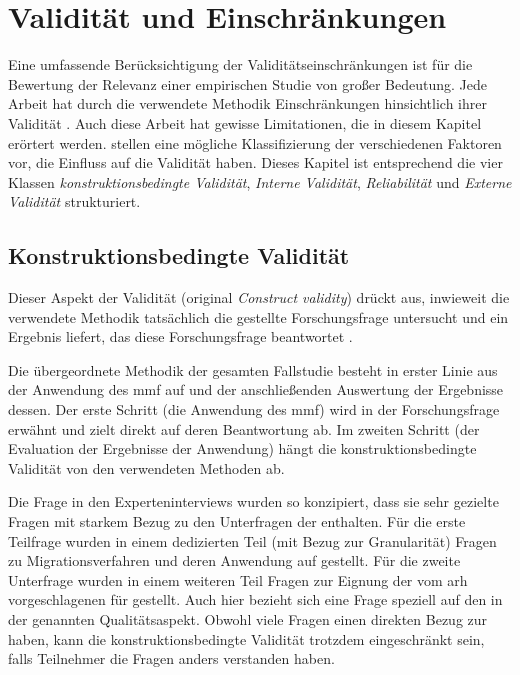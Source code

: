 \chapter{Validität und Einschränkungen}
\label{chap:gueltigkeit}

Eine umfassende Berücksichtigung der Validitätseinschränkungen ist für die Bewertung der Relevanz einer empirischen Studie von großer Bedeutung. 
Jede Arbeit hat durch die verwendete Methodik Einschränkungen hinsichtlich ihrer Validität \cite{campbell2015experimental}.
Auch diese Arbeit hat gewisse Limitationen, die in diesem Kapitel erörtert werden.
 stellen eine mögliche Klassifizierung der verschiedenen Faktoren vor, die Einfluss auf die Validität haben.
Dieses Kapitel ist entsprechend die vier Klassen \emph{konstruktionsbedingte Validität}, \emph{Interne Validität}, \emph{Reliabilität} und \emph{Externe Validität} strukturiert.

\section{Konstruktionsbedingte Validität}

Dieser Aspekt der Validität (original \emph{Construct validity}) drückt aus, inwieweit die verwendete Methodik tatsächlich die gestellte Forschungsfrage untersucht und ein Ergebnis liefert, das diese Forschungsfrage beantwortet \cite{Runeson2009}.

Die übergeordnete Methodik der gesamten Fallstudie besteht in erster Linie aus der Anwendung des \gls{mmf} auf \jf und der anschließenden Auswertung der Ergebnisse dessen.
Der erste Schritt (die Anwendung des \gls{mmf}) wird in der Forschungsfrage erwähnt und zielt direkt auf deren Beantwortung ab.
Im zweiten Schritt (der Evaluation der Ergebnisse der Anwendung) hängt die konstruktionsbedingte Validität von den verwendeten Methoden ab.

Die Frage in den Experteninterviews wurden so konzipiert, dass sie sehr gezielte Fragen mit starkem Bezug zu den Unterfragen der \ff enthalten.
Für die erste Teilfrage wurden in einem dedizierten Teil (mit Bezug zur Granularität) Fragen zu Migrationsverfahren und deren Anwendung auf \jf gestellt.
Für die zweite Unterfrage wurden in einem weiteren Teil Fragen zur Eignung der vom \gls{arh} vorgeschlagenen \bpp für \jf gestellt.
Auch hier bezieht sich eine Frage speziell auf den in der \ff genannten Qualitätsaspekt.
Obwohl viele Fragen einen direkten Bezug zur \ff haben, kann die konstruktionsbedingte Validität trotzdem eingeschränkt sein, falls Teilnehmer die Fragen anders verstanden haben.

